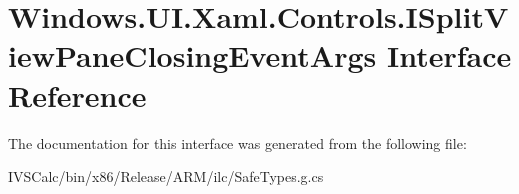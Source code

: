 \hypertarget{interface_windows_1_1_u_i_1_1_xaml_1_1_controls_1_1_i_split_view_pane_closing_event_args}{}\section{Windows.\+U\+I.\+Xaml.\+Controls.\+I\+Split\+View\+Pane\+Closing\+Event\+Args Interface Reference}
\label{interface_windows_1_1_u_i_1_1_xaml_1_1_controls_1_1_i_split_view_pane_closing_event_args}


The documentation for this interface was generated from the following file\+:\begin{DoxyCompactItemize}
\item 
I\+V\+S\+Calc/bin/x86/\+Release/\+A\+R\+M/ilc/Safe\+Types.\+g.\+cs\end{DoxyCompactItemize}
